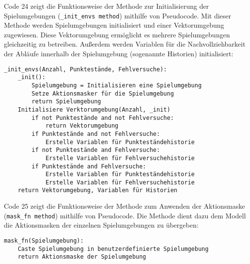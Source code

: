 \begin{minipage}{\linewidth}
Code 24 zeigt die Funktionsweise der Methode zur Initialisierung der Spielumgebungen (\texttt{\_init\_envs method}) mithilfe von Pseudocode. Mit dieser Methode werden Spielumgebungen initialisiert und einer Vektorumgebung zugewiesen. Diese Vektorumgebung ermöglicht es mehrere Spielumgebungen gleichzeitig zu betreiben. Außerdem werden Variablen für die Nachvollziehbarkeit der Abläufe innerhalb der Spielumgebung (sogenannte Historien) initialisiert:
\vspace{0.5cm}
\begin{lstlisting}[caption={Methode zur Initialisierung der Spielumgebungen},morekeywords={Anzahl, Punktestände, Fehlversuche}]
_init_envs(Anzahl, Punktestände, Fehlversuche):
	_init():
		Spielumgebung = Initialisieren eine Spielumgebung
		Setze Aktionsmasker für die Spielumgebung
		return Spielumgebung
	Initialisiere Verktorumgebung(Anzahl, _init)
		if not Punktestände and not Fehlversuche:
			return Vektorumgebung
		if Punktestände and not Fehlversuche:
			Erstelle Variablen für Punkteständehistorie
		if not Punktestände and Fehlversuche:
			Erstelle Variablen für Fehlversuchehistorie
		if Punktestände and Fehlversuche:
			Erstelle Variablen für Punkteständehistorie
			Erstelle Variablen für Fehlversuchehistorie
	return Vektorumgebung, Variablen für Historien
\end{lstlisting}
\end{minipage}

\begin{minipage}{\linewidth}
Code 25 zeigt die Funktionsweise der Methode zum Anwenden der Aktionsmaske (\texttt{mask\_fn method}) mithilfe von Pseudocode. Die Methode dient dazu dem Modell die Aktionsmasken der einzelnen Spielumgebungen zu übergeben:
\vspace{0.5cm}
\begin{lstlisting}[caption={Methode zum Anwenden der Aktionsmaske},morekeywords={Spielumgebung}]
mask_fn(Spielumgebung):
	Caste Spielumgebung in benutzerdefinierte Spielumgebung
	return Aktionsmaske der Spielumgebung
\end{lstlisting}
\end{minipage}

